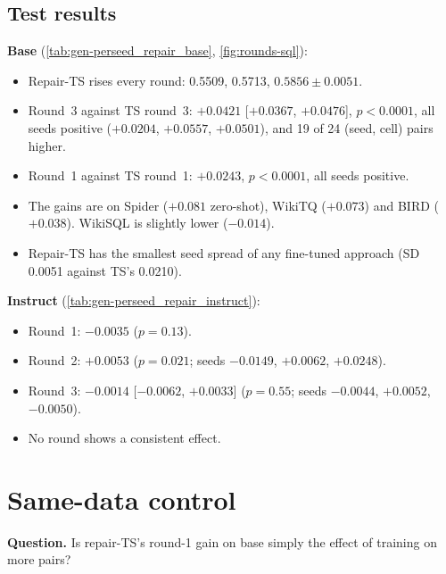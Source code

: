 \subsection{Test results}




\begin{observation}
\textbf{Base} (\cref{tab:gen-perseed_repair_base}, \cref{fig:rounds-sql}):
\begin{itemize}
\item Repair-TS rises every round: \Mviii{} 0.5509, 0.5713, $0.5856\pm0.0051$.
\item Round~3 against TS round~3: $+0.0421$ [$+0.0367$, $+0.0476$], $p<0.0001$, all seeds positive ($+0.0204$,
$+0.0557$, $+0.0501$), and 19 of 24 (seed, cell) pairs higher.
\item Round~1 against TS round~1: $+0.0243$, $p<0.0001$, all seeds positive.
\item The gains are on Spider ($+0.081$ zero-shot), WikiTQ ($+0.073$) and BIRD ($+0.038$). WikiSQL is slightly lower
($-0.014$).
\item Repair-TS has the smallest seed spread of any fine-tuned approach (SD 0.0051 against TS's 0.0210).
\end{itemize}

\textbf{Instruct} (\cref{tab:gen-perseed_repair_instruct}):
\begin{itemize}
\item Round~1: $-0.0035$ ($p=0.13$).
\item Round~2: $+0.0053$ ($p=0.021$; seeds $-0.0149$, $+0.0062$, $+0.0248$).
\item Round~3: $-0.0014$ [$-0.0062$, $+0.0033$] ($p=0.55$; seeds $-0.0044$, $+0.0052$, $-0.0050$).
\item No round shows a consistent effect.
\end{itemize}
\end{observation}

\section{Same-data control}\label{sec:ext-control}

\textbf{Question.} Is repair-TS's round-1 gain on base simply the effect of training on more pairs?



